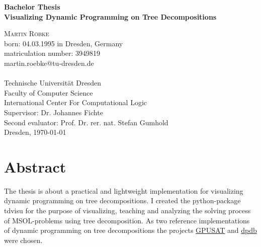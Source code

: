 \documentclass[a4paper, 12pt]{scrartcl}
\begin{document}
\begin{titlepage}
	\begin{center}
		{\Large\bfseries Bachelor Thesis}           \\[6.5ex]
		
		{\huge\bfseries Visualizing Dynamic Programming on Tree Decompositions}                  \\[6.5ex]
		
		\vspace{6ex}
				
		\textsc{\Large Martin Röbke}    \\[3ex]
		{\Large born: 04.03.1995 in Dresden, Germany}    \\[2ex]
		{\Large matriculation number: 3949819}    \\[2ex]
		{\Large martin.roebke@tu-dresden.de}    \\[2ex]
		\textsc{\large 
			}             \\[12ex]
		\vfill
		{\Large Technische Universität Dresden}               \\
		Faculty of Computer Science \\
		International Center For Computational Logic 		\\[5ex]
		
		{\Large Supervisor: Dr. Johannes Fichte}\\[2ex]
		{\Large Second evaluator:  Prof. Dr. rer. nat. Stefan Gumhold}\\[5ex]
		
		\vfill
		Dresden, \today
	\end{center}
\end{titlepage}



\section*{Abstract}
\vspace{4ex}
The thesis is about a practical and lightweight implementation for visualizing dynamic programming on tree decompositions.
I created the python-package tdvisu for the purpose of visualizing, teaching and analyzing the solving process of MSOL-problems using tree decomposition.
As two reference implementations of dynamic programming on tree decompositions the projects \href{https://github.com/daajoe/GPUSAT}{GPUSAT} and \href{https://github.com/hmarkus/dp_on_dbs}{dpdb} were chosen.
\end{document}
